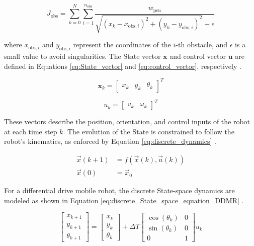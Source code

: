 \documentclass[conference]{IEEEtran}
\begin{document}
\begin{equation}
\label{eq:J_obs}
J_{\text{obs}} = \sum_{k=0}^{N} \sum_{i=1}^{n_{\text{obs}}} \frac{w_{\text{pen}}}{\sqrt{(x_k - x_{\text{obs},i})^2 + (y_k - y_{\text{obs},i})^2} + \epsilon}
\end{equation}

where \(x_{\text{obs},i}\) and \(y_{\text{obs},i}\) represent the coordinates of the \(i\)-th obstacle, and \(\epsilon\) is a small value to avoid singularities. 
The State vector \(\mathbf{x}\) and control vector \(\mathbf{u}\) are defined in Equations \ref{eq:State_vector} and \ref{eq:control_vector}, respectively \cite{liniger2015nonlinear}.

\begin{equation}\label{eq:State_vector}
    \mathbf{x}_k = \begin{bmatrix} x_k & y_k & \theta_k \end{bmatrix}^T
\end{equation}

\begin{equation}\label{eq:control_vector}
    u_k = \begin{bmatrix}
    v_k & \omega_k
\end{bmatrix}^T
\end{equation}

These vectors describe the position, orientation, and control inputs of the robot at each time step \(k\). The evolution of the State is constrained to follow the robot's kinematics, as enforced by Equation \ref{eq:discrete_dynamics} \cite{liniger2015nonlinear}.

\begin{align}
\vec{x}(k+1) &= f(\vec{x}(k), \vec{u}(k)) \label{eq:discrete_dynamics} \\
\vec{x}(0) &= \vec{x}_0
\end{align}

For a differential drive mobile robot, the discrete State-space dynamics are modeled as shown in Equation \ref{eq:discrete_State_space_equation_DDMR} \cite{thrun2005probabilistic}.

\begin{equation} \label{eq:discrete_State_space_equation_DDMR}
\begin{bmatrix}
    x_{k+1} \\
    y_{k+1} \\
    \theta_{k+1}
\end{bmatrix}
=
\begin{bmatrix}
    x_k \\
    y_k \\
    \theta_k
\end{bmatrix}
+ \Delta T
\begin{bmatrix}
    \cos(\theta_k) & 0 \\
    \sin(\theta_k) & 0 \\
    0 & 1
\end{bmatrix}
u_k
\end{equation}
\end{document}
